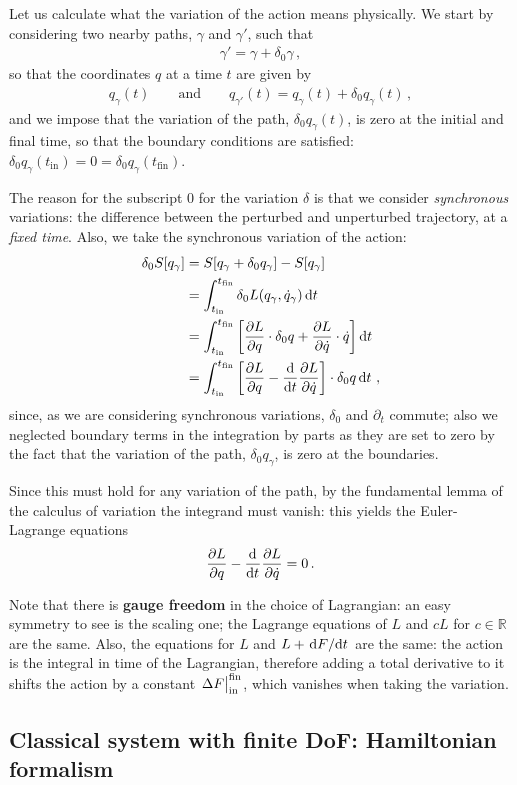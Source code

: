 \documentclass[main.tex]{subfiles}
\begin{document}
Let us calculate what the variation of the action means physically. We start by considering two nearby paths, \(\gamma \) and \(\gamma '\), such that 
%
\begin{align}
\gamma ' = \gamma + \delta_0 \gamma 
\,,
\end{align}
%
so that the coordinates \(q\) at a time \(t\) are given by 
%
\begin{align}
q_{\gamma } (t) 
\qquad \text{and} \qquad
q_{\gamma '} (t) = q_{\gamma }(t) + \delta_0 q_{\gamma }(t)
\,,
\end{align}
%
and we impose that the variation of the path, \(\delta_0 q_{\gamma } (t)\), is zero at the initial and final time, so that the boundary conditions are satisfied: \(\delta_0 q_{\gamma }(t _{\text{in}}) = 0 = \delta_0 q_{\gamma }(t _{\text{fin}})\).

The reason for the subscript \(0\) for the variation \(\delta \) is that we consider \emph{synchronous} variations: the difference between the perturbed and unperturbed trajectory, at a \emph{fixed time}. 
Also, we take the synchronous variation of the action:
%
\begin{align}
\delta_0 S [q_{\gamma }] &= S [q_{\gamma } + \delta_0 q_{\gamma }] - S[q_{\gamma }]  \\
&= \int_{t _{\text{in}}}^{t _{\text{fin}}} \delta_0 L (q_{\gamma }, \dot{q}_{\gamma }) \dd{t}  \\
&= \int_{t _{\text{in}}}^{t _{\text{fin}}} \qty[ \pdv{L}{q} \cdot \delta_0 q + \pdv{L}{\dot{q}} \cdot \dot{q}] \dd{t}  \\
&= \int_{t _{\text{in}}}^{t _{\text{fin}}} \qty[\pdv{L}{q}  - \dv{}{t} \pdv{L}{\dot{q}}] \cdot \delta_0 q \dd{t}
\,,
\end{align}
%
since, as we are considering synchronous variations, \(\delta_0 \) and \(\partial_{t}\) commute; also we neglected boundary terms in the integration by parts as they are set to zero by the fact that the variation of the path,  \(\delta_0 q_{\gamma }\), is zero at the boundaries.

Since this must hold for any variation of the path, by the fundamental lemma of the calculus of variation the integrand must vanish: this yields the Euler-Lagrange equations 
%
\begin{align}
\pdv{L}{q} - \dv[]{}{t} \pdv{L}{\dot{q}} = 0
\,.
\end{align}

Note that there is \textbf{gauge freedom} in the choice of Lagrangian: an easy symmetry to see is the scaling one; the Lagrange equations of \(L\) and \(cL\) for \(c \in \mathbb{R}\) are the same. 
Also, the equations for \(L\) and \(L + \dv*{F}{t}\) are the same: the action is the integral in time of the Lagrangian, therefore adding a total derivative to it shifts the action by a constant \(\eval{\Delta F}_{\text{in}}^{\text{fin}}\), which vanishes when taking the variation.

\subsection{Classical system with finite DoF: Hamiltonian formalism}
\end{document}
